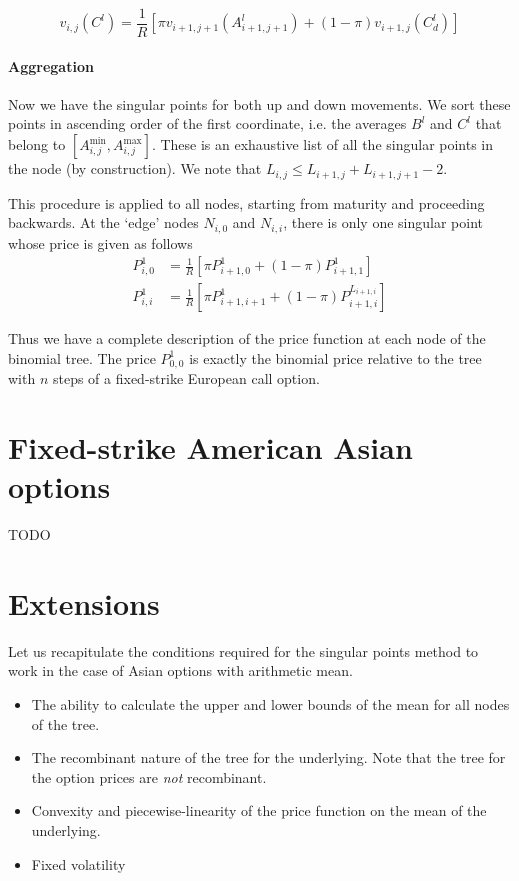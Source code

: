 \begin{equation}
	\label{eq:sp-dn-pr}
	v_{i,j}( C^l ) = \frac{1}{R} \left[ \pi v_{i+1,j+1} \left( A_{i+1,j+1}^l \right) + (1 - \pi) v_{i+1,j} \left( C^l_d \right) \right]
\end{equation}


\paragraph{Aggregation}

Now we have the singular points for both up and down movements. We sort these points in ascending order of the first coordinate, i.e. the averages $ B^l $ and $ C^l $ that belong to $ \left[ A_{i,j}^{\min}, A_{i,j}^{\max} \right] $. These is an exhaustive list of all the singular points in the node (by construction). We note that $ L_{i,j} \leq L_{i+1,j} + L_{i+1,j+1} - 2 $.

This procedure is applied to all nodes, starting from maturity and proceeding backwards. At the `edge' nodes $ N_{i,0} $ and $ N_{i,i} $, there is only one singular point whose price is given as follows
\begin{subequations}
	\label{eq:sp-terminal-nodes}
	\begin{align}
		P_{i,0}^1 &= \frac{1}{R} \left[ \pi P_{i+1,0}^1 + (1 - \pi) P_{i+1,1}^1 \right] \\
		P_{i,i}^1 &= \frac{1}{R} \left[ \pi P_{i+1,i+1}^1 + (1 - \pi) P_{i+1,i}^{L_{i+1,i}} \right]
	\end{align}
\end{subequations}

Thus we have a complete description of the price function at each node of the binomial tree. The price $ P_{0,0}^1 $ is exactly the binomial price relative to the tree with $n$ steps of a fixed-strike European call option.


\section{Fixed-strike American Asian options}
\label{sec:fixed-strike-am}



TODO
\clearpage


\section{Extensions}
\label{sec:sp-extensions}

Let us recapitulate the conditions required for the singular points method to work in the case of Asian options with arithmetic mean.
\begin{itemize}
\item The ability to calculate the upper and lower bounds of the mean for all nodes of the tree.
\item The recombinant nature of the tree for the underlying. Note that the tree for the option prices are \emph{not} recombinant.
\item Convexity and piecewise-linearity of the price function on the mean of the underlying.
\item Fixed volatility
\end{itemize}

